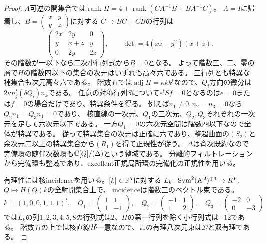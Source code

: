 \begin{proof}
$A$可逆の開集合では$\operatorname{rank}H=4+\operatorname{rank}(CA^{-1}B+BA^{-1}C)$。
$A=I$に帰着し、$B=\left(\begin{smallmatrix}x&y\\y&z\end{smallmatrix}\right)$に対する
$C\mapsto BC+CB$の行列は
\[
 \begin{pmatrix}2x&2y&0\\y&x+z&y\\0&2y&2z\end{pmatrix},\qquad
 \det=4(xz-y^2)(x+z).
\]
その階数が一以下なら二次小行列式から$B=0$となる。
よって階数三、二、零の層で$H$の階数四以下の集合の次元はいずれも高々六である。
三行列とも特異な補集合も次元高々六である。
階数五では$\operatorname{adj}H=\kappa kk^t$なので、$Q_i$方向の微分は
$2\kappa n_j^t(\delta Q_i)n_k$である。
任意の対称行列$S$について$e^tSf=0$となるのは$e=0$または$f=0$の場合だけであり、特異条件を得る。
例えば$n_1\ne0,n_2=n_3=0$なら$Q_2n_1=Q_3n_1=0$であり、
核直線の一次元、$Q_1$の三次元、$Q_2,Q_3$それぞれの一次元を足して六次元以下である。
一方$Q_1=0$の六次元空間は階数四以下なので全体が特異である。
従って特異集合の次元は正確に六であり、整超曲面の$(S_2)$と余次元二以上の特異集合から$(R_1)$を得て正規性が従う。
$\Delta$は斉次既約なので完備環の随伴次数環も$\mathbb C[Q]/(\Delta)$という整域である。
分離的フィルトレーションから完備環も整域であり、excellent正規局所環の完備化の正規性を用いる。

有理性には核incidenceを用いる。$[k]\in\mathbb P^5$に対する
$L_k:\operatorname{Sym}^2(K^2)^{\oplus3}\to K^6$, $Q\mapsto H(Q)k$の全射開集合上で、
incidenceは階数三のベクトル束である。
\[
 k=(1,0,0,1,1,1)^t,\quad
 Q_1=\begin{pmatrix}1&1\\1&-1\end{pmatrix},\quad
 Q_2=\begin{pmatrix}-1&1\\1&2\end{pmatrix},\quad
 Q_3=\begin{pmatrix}-2&0\\0&-3\end{pmatrix}
\]
では$L_k$の列$1,2,3,4,5,8$の行列式は$2$、$H$の第一行列を除く小行列式は$-12$である。
階数五の上では核直線が一意なので、この有理八次元束は$\mathcal D$と双有理である。
\end{proof}


